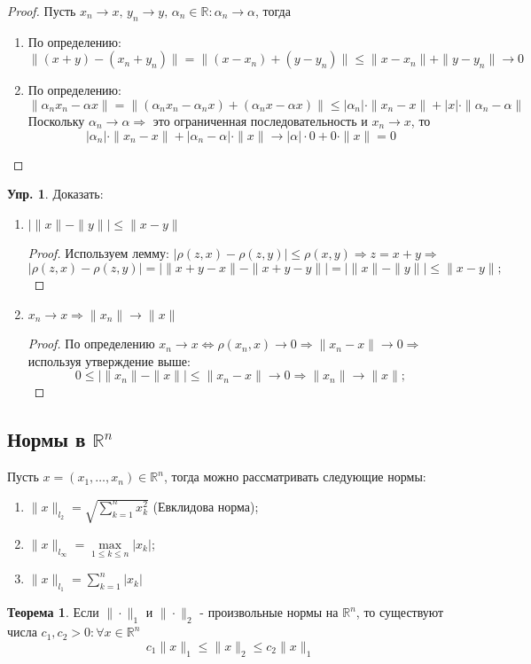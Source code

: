 \documentclass[12pt]{article}
\newcommand{\MR}{\mathbb{R}}
\theoremstyle{definition}
\newtheorem{exrc}{Упр.}
\newtheorem{theorem}{Теорема}
\begin{document}
\begin{proof}Пусть $x_n \to x, \, y_n \to y, \, \alpha_n \in \MR \colon \alpha_n \to \alpha$, тогда
	\begin{enumerate}[label={(\arabic*)}]
		\item По определению: 
		$$
			\|(x+y) - (x_n + y_n)\| = \|(x-x_n) + (y - y_n)\| \leq \|x - x_n\| + \|y - y_n\| \to 0
		$$
		\item По определению: 
		$$
			\|\alpha_n x_n - \alpha x \| = \|(\alpha_n x_n - \alpha_n x) + (\alpha_n x - \alpha x)\| \leq |\alpha_n|{\cdot} \|x_n - x\| + |x| {\cdot}\|\alpha_n - \alpha\|
		$$ 
		Поскольку $\alpha_n \to \alpha \Rightarrow$ это ограниченная последовательность и $x_n \to x$, то 
		$$
			|\alpha_n|{\cdot} \|x_n - x\| +  |\alpha_n - \alpha|{\cdot}\|x\| \to |\alpha|\cdot 0 + 0 \cdot \|x\| = 0
		$$
	\end{enumerate}
\end{proof}

\begin{exrc}
	Доказать:
	\begin{enumerate}[label={\arabic*)}]
		\item $\big|\|x\| - \|y\|\big| \leq \|x-y\|$
		\begin{proof}
			Используем лемму: $|\rho(z,x) - \rho(z,y)| \leq \rho(x,y) \Rightarrow z = x + y \Rightarrow$
			$$|\rho(z,x) - \rho(z,y)| = \big|\|x + y - x\| - \|x + y - y\|\big| = \big|\|x\| - \|y\|\big| \leq \|x -y\|;$$
		\end{proof}
		\item $x_n \to x \Rightarrow \|x_n\| \to \|x\|$
		\begin{proof}
			По определению $x_n \to x \Leftrightarrow \rho(x_n,x) \to 0 \Rightarrow \|x_n - x\| \to 0 \Rightarrow$ используя утверждение выше:
			$$ 0 \leq \big|\|x_n\| - \|x\| \big| \leq \|x_n - x\| \to 0 \Rightarrow \|x_n\| \to \|x\|;
			$$
		\end{proof}
	\end{enumerate}
\end{exrc}

\subsection*{Нормы в $\MR^n$}
Пусть $x = (x_1, \dotsc, x_n) \in \MR^n$, тогда можно рассматривать следующие нормы:
\begin{enumerate}[label={(\arabic*)}]
	\item $\|x\|_{l_2} = \sqrt{\displaystyle \sum\limits_{k=1}^{n}x_k^2}$ (Евклидова норма);
	\item $\|x\|_{l_\infty} = \max\limits_{1 \leq k \leq n} |x_k|$;
	\item $\|x\|_{l_1} = \displaystyle \sum\limits_{k=1}^{n}|x_k|$
\end{enumerate}
\begin{theorem}
	Если $\|\cdot\|_1$ и $\|\cdot\|_2$ - произвольные нормы на $\MR^n$, то существуют числа $c_1, c_2 > 0 \colon \forall x \in \MR^n$
	$$
	c_1 \|x\|_1 \leq \|x\|_2 \leq c_2 \|x\|_1
	$$
\end{theorem}
\end{document}
